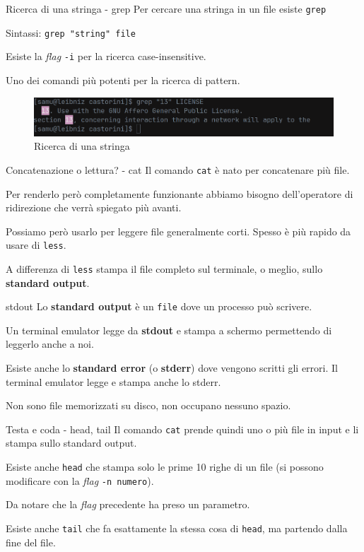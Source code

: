\documentclass{beamer}
\begin{document}
\begin{frame}{Ricerca di una stringa - grep}
  Per cercare una stringa in un file esiste \texttt{grep}\bigskip

  Sintassi: \texttt{grep "string" file}\bigskip

  Esiste la \textit{flag} \texttt{-i} per la ricerca case-insensitive.\bigskip

  Uno dei comandi più potenti per la ricerca di pattern.
  \begin{figure}
    \includegraphics[width=\textwidth]{assets/command-grep.png}
    \caption{Ricerca di una stringa}
  \end{figure}
\end{frame}

\begin{frame}{Concatenazione o lettura? - cat}
  Il comando \texttt{cat} è nato per concatenare più file.\bigskip

  Per renderlo però completamente funzionante abbiamo bisogno dell'operatore
  di ridirezione che verrà spiegato più avanti.\bigskip

  Possiamo però usarlo per leggere file generalmente corti. Spesso è più rapido
  da usare di \texttt{less}.\bigskip

  A differenza di \texttt{less} stampa il file completo sul terminale, o meglio,
  sullo \textbf{standard output}.
\end{frame}

\begin{frame}{stdout}
  Lo \textbf{standard output} è un \texttt{file} dove un processo può 
  scrivere.\bigskip

  Un terminal emulator legge da \textbf{stdout} e stampa a schermo permettendo
  di leggerlo anche a noi.\bigskip

  Esiste anche lo \textbf{standard error} (o \textbf{stderr}) dove vengono 
  scritti gli errori. Il terminal emulator legge e stampa anche lo stderr.
  \bigskip

  Non sono file memorizzati su disco, non occupano nessuno spazio.
\end{frame}

\begin{frame}{Testa e coda - head, tail}
  Il comando \texttt{cat} prende quindi uno o più file in input e li stampa
  sullo standard output.\bigskip

  Esiste anche \texttt{head} che stampa solo le prime 10 righe di un file (si
  possono modificare con la \textit{flag} \texttt{-n numero}).\medskip

  Da notare che la \textit{flag} precedente ha preso un parametro.\bigskip

  Esiste anche \texttt{tail} che fa esattamente la stessa cosa di \texttt{head}, 
  ma partendo dalla fine del file.
\end{frame}
\end{document}
